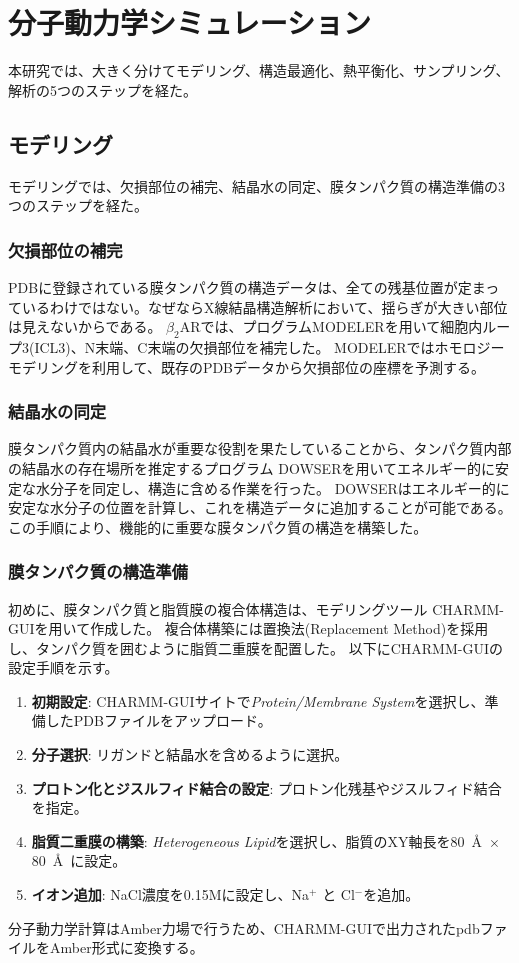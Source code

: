 \section{分子動力学シミュレーション}
\label{sec:md}
本研究では、大きく分けてモデリング、構造最適化、熱平衡化、サンプリング、解析の5つのステップを経た。

\subsection{モデリング}
モデリングでは、欠損部位の補完、結晶水の同定、膜タンパク質の構造準備の3つのステップを経た。

\subsubsection{欠損部位の補完}
PDBに登録されている膜タンパク質の構造データは、全ての残基位置が定まっているわけではない。なぜならX線結晶構造解析において、揺らぎが大きい部位は見えないからである。
$\beta_2$ARでは、プログラムMODELER\cite{Sali1995}を用いて細胞内ループ3(ICL3)、N末端、C末端の欠損部位を補完した。
MODELERではホモロジーモデリングを利用して、既存のPDBデータから欠損部位の座標を予測する。

\subsubsection{結晶水の同定}

膜タンパク質内の結晶水が重要な役割を果たしていることから、タンパク質内部の結晶水の存在場所を推定するプログラム DOWSER\cite{Zhang1996}を用いてエネルギー的に安定な水分子を同定し、構造に含める作業を行った。
DOWSERはエネルギー的に安定な水分子の位置を計算し、これを構造データに追加することが可能である。この手順により、機能的に重要な膜タンパク質の構造を構築した。

\subsubsection{膜タンパク質の構造準備}
初めに、膜タンパク質と脂質膜の複合体構造は、モデリングツール CHARMM-GUI\cite{CHARMMGUI}を用いて作成した。
複合体構築には置換法(Replacement Method)を採用し、タンパク質を囲むように脂質二重膜を配置した。
以下にCHARMM-GUIの設定手順を示す。
\begin{enumerate}
    \item \textbf{初期設定}: CHARMM-GUIサイトで\textit{Protein/Membrane System}を選択し、準備したPDBファイルをアップロード。
    \item \textbf{分子選択}: リガンドと結晶水を含めるように選択。
    \item \textbf{プロトン化とジスルフィド結合の設定}: プロトン化残基やジスルフィド結合を指定。
    \item \textbf{脂質二重膜の構築}: \textit{Heterogeneous Lipid}を選択し、脂質のXY軸長を80~\AA\ $\times$ 80~\AA\ に設定。
    \item \textbf{イオン追加}: NaCl濃度を0.15Mに設定し、Na$^{+}$ と Cl$^{-}$を追加。
\end{enumerate}
分子動力学計算はAmber力場で行うため、CHARMM-GUIで出力されたpdbファイルをAmber形式に変換する。

